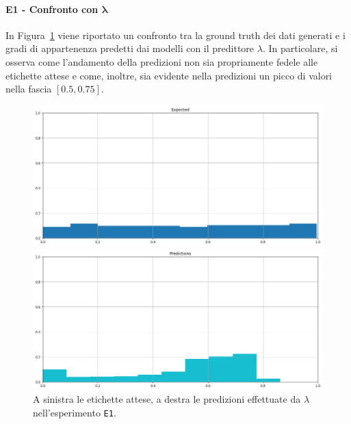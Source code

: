 \documentclass[12pt]{report}
\theoremstyle{definition}
\begin{document}
\paragraph{E1 - Confronto con $\bm{\lambda}$}
In Figura~\ref{prediction_exp1} viene riportato un confronto tra la ground truth dei dati generati e i gradi di appartenenza predetti dai modelli con il predittore $\lambda$. In particolare, si osserva come l'andamento della predizioni non sia propriamente fedele alle etichette attese e come, inoltre, sia evidente nella predizioni un picco di valori nella fascia $[0.5, 0.75]$.
\begin{figure}
\centering
    \begin{minipage}{0.48\textwidth}
        \includegraphics[width=\linewidth]{images/experiment_uniform_disgiunti/expected_memberships.png}
    \end{minipage}
    \begin{minipage}{0.48\textwidth}
        \includegraphics[width=\linewidth]{images/experiment_uniform_disgiunti/prediction_memberships.png}
    \end{minipage}
    \caption{A sinistra le etichette attese, a destra le predizioni effettuate da $\lambda$ nell'esperimento \texttt{E1}.}
    \label{prediction_exp1}
\end{figure} 
\end{document}

